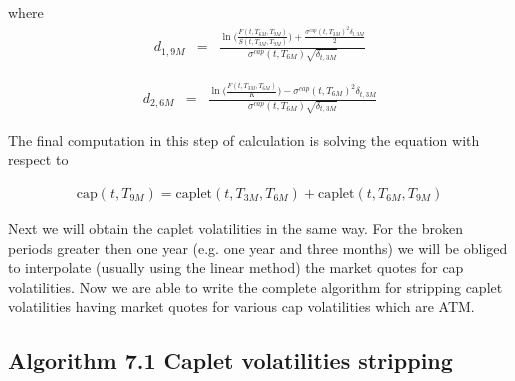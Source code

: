\documentclass[11pt]{article}
\numberwithin{equation}{subsection}
\begin{document}
where 
\begin{eqnarray*}
	d_{1,9M}&=&\frac{\ln\Big(\frac{F(t, T_{6M}, T_{9M})}{S(t, T_{3M}, T_{9M})}\Big) + \frac{\sigma^{cap}(t, T_{3M})^2 \delta_{t, 3M}}{2}}{\sigma^{cap}(t, T_{6M})\sqrt{\delta_{t,3M}}}
\end{eqnarray*}

\begin{eqnarray*}
	d_{2,6M}&=&\frac{\ln\Big(\frac{F(t, T_{3M}, T_{6M})}{K}\Big) - \sigma^{cap}(t, T_{6M})^2\delta_{t, 3M}}{\sigma^{cap}(t, T_{6M})\sqrt{\delta_{t,3M}}}
\end{eqnarray*}

The final computation in this step of calculation is solving the equation with respect to

\begin{eqnarray*}
	\text{cap}(t, T_{9M}) = \text{caplet}(t, T_{3M}, T_{6M}) + \text{caplet}(t, T_{6M}, T_{9M})
\end{eqnarray*}


Next we will obtain the caplet volatilities in the same way. For the broken periods greater
then one year (e.g. one year and three months) we will be obliged to interpolate (usually
using the linear method) the market quotes for cap volatilities.
Now we are able to write the complete algorithm for stripping caplet volatilities having
market quotes for various cap volatilities which are ATM.


\subsection*{Algorithm 7.1 Caplet volatilities stripping}
\end{document}
